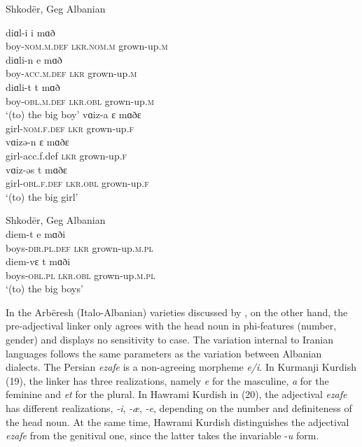 \documentclass[output=paper]{langsci/langscibook}
\begin{document}
\ea%
    Shkodër, Geg Albanian\label{ex:manzini:17}\\
    \begin{xlista}
    \ex
    \gll diɑl-i      i     mɑð           \\
         boy-\textsc{nom.m.def}   \textsc{lkr.nom.m}  grown-up.\textsc{m}\\
    \ex
    \gll diɑli-n     e     mɑð    \\
         boy-\textsc{acc.m.def}     \textsc{lkr}    grown-up.\textsc{m}\\
    \ex
    \gll diɑli-t              t     mɑð  \\
         boy-\textsc{obl.m.def}  \textsc{lkr.obl}  grown-up.\textsc{m}\\
    \glt ‘(to) the big boy’
    \gll vɑiz-a     ɛ     mɑðɛ    \\
         girl-\textsc{nom.f.def}   \textsc{lkr}    grown-up.\textsc{f} \\
    \gll vɑizə-n     ɛ     mɑðɛ    \\
         girl-acc.f.def    \textsc{lkr}    grown-up.\textsc{f}\\
    \gll vɑiz-əs    t     mɑðɛ \\
         girl-\textsc{obl.f.def}    \textsc{lkr.obl}  grown-up.\textsc{f}\\
    \glt ‘(to) the big girl’
    \end{xlista}
\z


\ea%
    Shkodër, Geg Albanian\label{ex:manzini:18}\\
    \ea
    \gll diem-t     e   mɑði     \\
         boys-\textsc{dir.pl.def}  \textsc{lkr}  grown-up.\textsc{m.pl}  \\
    \ex
    \gll diem-vɛ    t     mɑði \\
         boys-\textsc{obl.pl}     \textsc{lkr.obl}  grown-up.\textsc{m.pl}\\
    \glt ‘(to) the big boys’  
    \z
\z

In the Arbëresh (Italo-Albanian) varieties discussed by \citet{Manzini2011Grammatical}, on the other hand, the pre-adjectival linker only agrees with the head noun in phi-features (number, gender) and displays no sensitivity to case. The variation internal to Iranian languages follows the same parameters as the variation between Albanian dialects. The Persian \textit{ezafe} is a non-agreeing morpheme \textit{e\slash i}. In Kurmanji Kurdish (19), the linker has three realizations, namely \textit{e} for the masculine, \textit{a} for the feminine and \textit{et} for the plural. In Hawrami Kurdish in (20), the adjectival \textit{ezafe} has different realizations, \textit{{}-i}, \textit{{}-æ}, \textit{{}-e}, depending on the number and definiteness of the head noun. At the same time, Hawrami Kurdish distinguishes the adjectival \textit{ezafe} from the genitival one, since the latter takes the invariable -\textit{u} form.
\end{document}
